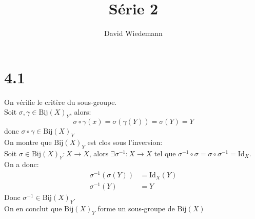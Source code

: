 \documentclass[11pt, a4paper, twoside]{article}
\newcommand{\Bij}{\mathrm{Bij}}
\newcommand{\Id}{\mathrm{Id}}
\begin{document}
\title{Série 2}
\author{David Wiedemann}
\maketitle
\section*{4.1}
On vérifie le critère du sous-groupe.\\
Soit $\sigma, \gamma \in \Bij(X)_Y $, alors:
\[ 
	\sigma \circ \gamma (x)=\sigma(\gamma(Y))= \sigma(Y) = Y
\]
donc $\sigma \circ \gamma \in \Bij(X)_Y$\\
On montre que $\Bij(X)_Y$ est clos sous l'inversion:\\
Soit $\sigma \in \Bij(X)_Y: X \to X$, alors $\exists \sigma^{-1}: X \to X$ tel que $\sigma^{-1}\circ \sigma = \sigma \circ \sigma^{-1} = \Id_X$. On a donc:
\begin{align*}
	\sigma^{-1}(\sigma(Y)) &= \Id_X(Y)\\
	\sigma^{-1}(Y) &= Y
\end{align*}
Donc $\sigma^{-1} \in \Bij(X)_Y$.\\
On en conclut que $\Bij(X)_Y$ forme un sous-groupe de $\Bij(X)$
\end{document}
